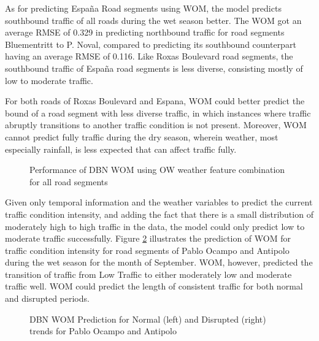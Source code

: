 As for predicting España Road segments using WOM, the model predicts southbound traffic of all roads during the wet season better. The WOM got an average RMSE of 0.329 in predicting northbound traffic for road segments Bluementritt to P. Noval, compared to predicting its southbound counterpart having an average RMSE of 0.116. Like Roxas Boulevard road segments, the southbound traffic of España road segments is less diverse, consisting mostly of low to moderate traffic.

For both roads of Roxas Boulevard and Espana, WOM could better predict the bound of a road segment with less diverse traffic, in which instances where traffic abruptly transitions to another traffic condition is not present. Moreover, WOM cannot predict fully traffic during the dry season, wherein weather, most especially rainfall, is less expected that can affect traffic fully. 


\begin{figure}[!t]
  \centering
  \captionsetup{justification=centering}
  \caption{Performance of DBN WOM using OW weather feature combination for all road segments}
  \label{fig:wom_feat_combi_roads}
\end{figure}

Given only temporal information and the weather variables to predict the current traffic condition intensity, and adding the fact that there is a small distribution of moderately high to high traffic in the data, the model could only predict low to moderate traffic successfully. Figure \ref{fig:WOM_normal_disrption_pocampo_antipolo_wet} illustrates the prediction of WOM for traffic condition intensity for road segments of Pablo Ocampo and Antipolo during the wet season for the month of September. WOM, however, predicted the transition of traffic from Low Traffic to either moderately low and moderate traffic well. WOM could predict the length of consistent traffic for both normal and disrupted periods. 

\begin{figure}[!t]
  \centering
  \captionsetup{justification=centering}
  \caption{DBN WOM Prediction for Normal (left) and Disrupted (right) trends for Pablo Ocampo and Antipolo}
  \label{fig:WOM_normal_disrption_pocampo_antipolo_wet}
\end{figure}

